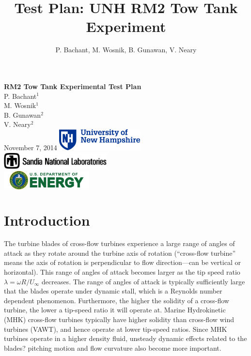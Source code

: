 \documentclass[12pt]{report}
\author{P. Bachant, M. Wosnik, B. Gunawan, V. Neary}
\title{Test Plan: UNH RM2 Tow Tank Experiment}
\begin{document}
\begin{titlepage}
    \centering
    \vfill
    {\bfseries\Large
        RM2 Tow Tank Experimental Test Plan\\
    }  
            \vskip2cm
            P. Bachant$^1$\\
            M. Wosnik$^1$\\
            B. Gunawan$^2$\\
            V. Neary$^2$\\  
    \vfill
    November 7, 2014
    \vfill
    \includegraphics[width=0.33\textwidth]{figures/unhlogo} \\
    \vspace{0.1in}
    \includegraphics[width=0.42\textwidth]{figures/snllogo} \\
    \vspace{0.1in}
    \includegraphics[width=0.35\textwidth]{figures/doelogo}
    \vfill
    \vfill
\end{titlepage}

\tableofcontents
\listoffigures

\chapter{Introduction}

The turbine blades of cross-flow turbines experience a large range of angles of
attack as they rotate around the turbine axis of rotation (``cross-flow
turbine'' means the axis of rotation is perpendicular to flow direction---can be
vertical or horizontal).  This range of angles of attack becomes larger as the
tip speed ratio $\lambda=\omega R/U_\infty$  decreases.  The range of angles of
attack is typically sufficiently large that the blades operate under dynamic
stall, which is a Reynolds number dependent phenomenon. Furthermore, the higher
the solidity of a cross-flow turbine, the lower a tip-speed ratio it will
operate at. Marine Hydrokinetic (MHK) cross-flow turbines typically have higher
solidity than cross-flow wind turbines (VAWT), and hence operate at lower
tip-speed ratios. Since MHK turbines operate in a higher density fluid, unsteady
dynamic effects related to the blades? pitching motion and flow curvature also
become more important.
\end{document}
